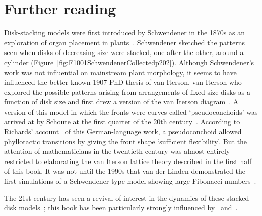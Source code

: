 \section{Further reading}Disk-stacking models were first introduced by Schwendener in the 1870s as an exploration of organ placement in plants~\cite{schwendenerMechanischeTheorieBlattstellungen1878}.  Schwendener sketched the patterns seen when disks of decreasing size were stacked, one after the other, around a cylinder (Figure~\ref{fig:F1001SchwendenerCollectedp202}).
Although Schwendener's work was not influential on mainstream plant morphology, it seems to have influenced the better known 1907 PhD thesis of van Iterson. van Iterson  who explored the possible patterns arising from arrangements of fixed-size disks as a function of disk size and first drew a version of the van Iterson diagram~\cite{vanitersonjrMathematischeUndMikroscopischAnatomische1907}. 
A version of this model in which the fronts were curves called `pseudoconchoids'  was  arrived at by Schoute at the first quarter of the 20th century~\cite{schouteUberPseudokonchoiden1913}. According to  Richards' account~\cite{richardsGeometryPhyllotaxisIts1948}  of this German-language work, a pseudoconchoid allowed phyllotactic transitions by giving the front shape `sufficient flexibility'. But 
the attention of mathematicians in the twentieth-century was almost entirely restricted to elaborating the van Iterson lattice theory described in the first half of this book.  It was not until the  1990s that van der Linden demonstrated the first simulations of a Schwendener-type model showing large Fibonacci numbers~\cite{vanderlindenCreatingPhyllotaxisDislodgement1990}.

The 21st century has seen a  revival of interest in the dynamics of these stacked-disk models~\cite{
	atelaDynamicalSystemPlant2002,
	atelaRhombicTilingsPrimordia2017,
	hottonPossibleActualPhyllotaxis2006,
	atelaGeometricDynamicEssence2011,adlerConsequencesContactPressure1977,godinPhyllotaxisGeometricCanalization2020};  this book has been particularly strongly influenced by~\cite{goleFibonacciQuasisymmetricPhyllotaxis2016} and~\cite{goleConvergenceDiskStacking2020}. 	
